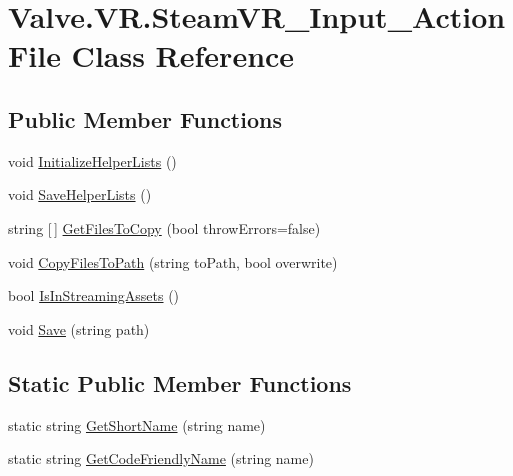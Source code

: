\hypertarget{class_valve_1_1_v_r_1_1_steam_v_r___input___action_file}{}\section{Valve.\+V\+R.\+Steam\+V\+R\+\_\+\+Input\+\_\+\+Action\+File Class Reference}
\label{class_valve_1_1_v_r_1_1_steam_v_r___input___action_file}
\subsection*{Public Member Functions}
\begin{DoxyCompactItemize}
\item 
void \mbox{\hyperlink{class_valve_1_1_v_r_1_1_steam_v_r___input___action_file_ad2c005c06fefb0b98a7e347efbea6102}{Initialize\+Helper\+Lists}} ()
\item 
void \mbox{\hyperlink{class_valve_1_1_v_r_1_1_steam_v_r___input___action_file_a4d1383186c22c947fc2330fe3c850f77}{Save\+Helper\+Lists}} ()
\item 
string \mbox{[}$\,$\mbox{]} \mbox{\hyperlink{class_valve_1_1_v_r_1_1_steam_v_r___input___action_file_a8c03e9031fa8e8422abb027aba2a59a1}{Get\+Files\+To\+Copy}} (bool throw\+Errors=false)
\item 
void \mbox{\hyperlink{class_valve_1_1_v_r_1_1_steam_v_r___input___action_file_a9ec2e625d10d93d546c5730d9b11f571}{Copy\+Files\+To\+Path}} (string to\+Path, bool overwrite)
\item 
bool \mbox{\hyperlink{class_valve_1_1_v_r_1_1_steam_v_r___input___action_file_a5d54def4009d0a415d5530fc85bd4565}{Is\+In\+Streaming\+Assets}} ()
\item 
void \mbox{\hyperlink{class_valve_1_1_v_r_1_1_steam_v_r___input___action_file_a6ef31fa0d9acce2fc48e0f76d68402a5}{Save}} (string path)
\end{DoxyCompactItemize}
\subsection*{Static Public Member Functions}
\begin{DoxyCompactItemize}
\item 
static string \mbox{\hyperlink{class_valve_1_1_v_r_1_1_steam_v_r___input___action_file_a881f0a23ed6e2fed60e2184aef07035f}{Get\+Short\+Name}} (string name)
\item 
static string \mbox{\hyperlink{class_valve_1_1_v_r_1_1_steam_v_r___input___action_file_a09049d3050af7c3cfe7d611fca459bc1}{Get\+Code\+Friendly\+Name}} (string name)
\end{DoxyCompactItemize}
